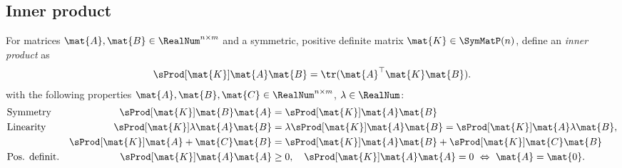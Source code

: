 \subsection{Inner product}\label{sec:RBSMathInnerProduct}

For matrices $\mat{A}, \mat{B} \in \RealNum^{n\times m}$ and a symmetric, positive definite matrix $ \mat{K} \in \SymMatP(n)$, define an \textit{inner product} as
\begin{align}\label{eq:DefMatrixInnerProduct}
 \sProd[\mat{K}]{\mat{A}}{\mat{B}} = \tr(\mat{A}^\top \mat{K} \mat{B}).
\end{align}
with the following properties $\mat{A}, \mat{B}, \mat{C} \in \RealNum^{n\times m}$, $\lambda \in \RealNum$:
\begin{subequations}
\begin{align}
 &\text{Symmetry}&
 \sProd[\mat{K}]{\mat{B}}{\mat{A}} %
 &= \sProd[\mat{K}]{\mat{A}}{\mat{B}}
\\
 &\text{Linearity}&
 \sProd[\mat{K}]{\lambda \mat{A}}{\mat{B}} &= \lambda \sProd[\mat{K}]{\mat{A}}{\mat{B}} = \sProd[\mat{K}]{\mat{A}}{\lambda \mat{B}},
\\
 &&
 \sProd[\mat{K}]{\mat{A}+\mat{C}}{\mat{B}} &= \sProd[\mat{K}]{\mat{A}}{\mat{B}} + \sProd[\mat{K}]{\mat{C}}{\mat{B}}
\\
 &\text{Pos. definit.}&
 \sProd[\mat{K}]{\mat{A}}{\mat{A}} &\geq 0, \quad \sProd[\mat{K}]{\mat{A}}{\mat{A}} = 0 \ \Leftrightarrow \ \mat{A} = \mat{0}.
\end{align}
\end{subequations}


